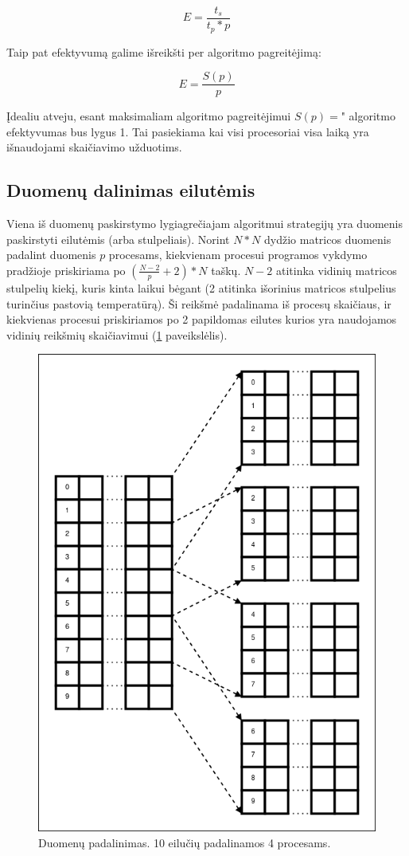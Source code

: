 \documentclass{VUMIFPSbakalaurinis}
\begin{document}
\[ E = \frac{t_s}{t_p * p}\]

Taip pat efektyvumą galime išreikšti per algoritmo pagreitėjimą:

\[ E = \frac{S(p)}{p}\]

Įdealiu atveju, esant maksimaliam algoritmo pagreitėjimui $S(p)=$" algoritmo efektyvumas bus lygus 1. Tai pasiekiama kai visi procesoriai visa laiką yra išnaudojami skaičiavimo užduotims. 


\subsection{Duomenų dalinimas eilutėmis}

Viena iš duomenų paskirstymo lygiagrečiajam algoritmui strategijų yra duomenis paskirstyti eilutėmis (arba stulpeliais).
Norint $N*N$ dydžio matricos duomenis padalint duomenis $p$ procesams, kiekvienam procesui programos vykdymo pradžioje priskiriama po  $(\frac{N-2}{p}+2) * N$ taškų. 
$N-2$ atitinka vidinių matricos stulpelių kiekį, kuris kinta laikui bėgant (2 atitinka išorinius matricos stulpelius turinčius pastovią temperatūrą). 
Ši reikšmė padalinama iš procesų skaičiaus, ir kiekvienas procesui priskiriamos po 2 papildomas eilutes kurios yra naudojamos vidinių reikšmių skaičiavimui (\ref{img:distribution} paveikslėlis).
\begin{figure}[H]
    \centering
    \includegraphics[scale=0.4]{img/distribution.png}
    \caption{Duomenų padalinimas. 10 eilučių padalinamos 4 procesams.}
    \label{img:distribution}
\end{figure}
\end{document}
